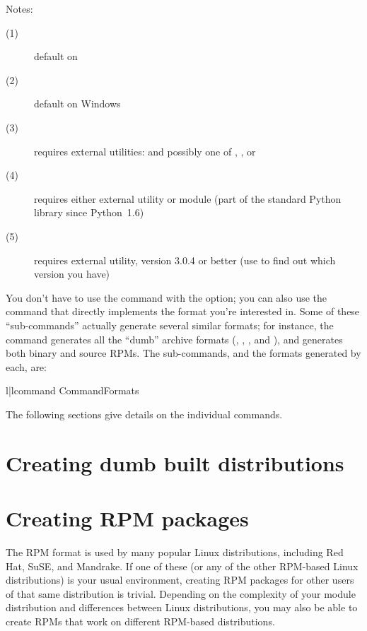 \documentclass{manual}
\begin{document}
\noindent Notes:
\begin{description}
\item[(1)] default on \UNIX
\item[(2)] default on Windows 
\item[(3)] requires external utilities:  and possibly one
  of , , or 
\item[(4)] requires either external  utility or
   module (part of the standard Python library since
  Python~1.6)
\item[(5)] requires external  utility, version 3.0.4 or
  better (use  to find out which version you have)
\end{description}

You don't have to use the  command with the
 option; you can also use the command that
directly implements the format you're interested in.  Some of these
 ``sub-commands'' actually generate several similar
formats; for instance, the  command generates all
the ``dumb'' archive formats (, , , and
), and  generates both binary and source
RPMs.  The  sub-commands, and the formats generated by
each, are:

\begin{tableii}{l|l}{command}%
  {Command}{Formats}
\end{tableii}

The following sections give details on the individual 
commands.


\section{Creating dumb built distributions}
\label{creating-dumb}



\section{Creating RPM packages}
\label{creating-rpms}

The RPM format is used by many popular Linux distributions, including
Red Hat, SuSE, and Mandrake.  If one of these (or any of the other
RPM-based Linux distributions) is your usual environment, creating RPM
packages for other users of that same distribution is trivial.
Depending on the complexity of your module distribution and differences
between Linux distributions, you may also be able to create RPMs that
work on different RPM-based distributions.
\end{document}

